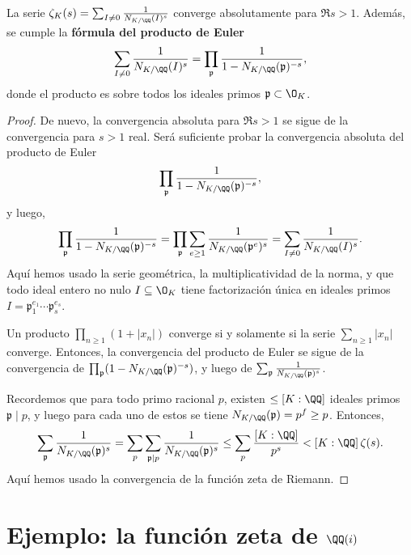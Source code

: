 \begin{proposicion}
  La serie $\zeta_K (s) = \sum_{I \ne 0} \frac{1}{N_{K/\QQ} (I)^s}$ converge
  absolutamente para $\Re s > 1$. Además, se cumple la
  \textbf{fórmula del producto de Euler}
  \[ \sum_{I \ne 0} \frac{1}{N_{K/\QQ} (I)^s} =
     \prod_{\mathfrak{p}} \frac{1}{1 - N_{K/\QQ} (\mathfrak{p})^{-s}}, \]
  donde el producto es sobre todos los ideales primos
  $\mathfrak{p} \subset \O_K$.

  \begin{proof}
    De nuevo, la convergencia absoluta para $\Re s > 1$ se sigue de la
    convergencia para $s > 1$ real. Será suficiente probar la convergencia
    absoluta del producto de Euler
    $$\prod_{\mathfrak{p}} \frac{1}{1 - N_{K/\QQ} (\mathfrak{p})^{-s}},$$
    y luego,
    \[ \prod_{\mathfrak{p}} \frac{1}{1 - N_{K/\QQ} (\mathfrak{p})^{-s}} =
       \prod_{\mathfrak{p}} \sum_{e \ge 1} \frac{1}{N_{K/\QQ} (\mathfrak{p}^e)^s} =
       \sum_{I\ne 0} \frac{1}{N_{K/\QQ} (I)^s}. \]
    Aquí hemos usado la serie geométrica, la multiplicatividad de la norma, y
    que todo ideal entero no nulo $I \subseteq \O_K$ tiene factorización única
    en ideales primos $I = \mathfrak{p}_1^{e_1}\cdots \mathfrak{p}_s^{e_s}$.

    Un producto $\prod_{n\ge 1} (1 + |x_n|)$ converge si y solamente si la serie
    $\sum_{n\ge 1} |x_n|$ converge. Entonces, la convergencia del producto de
    Euler se sigue de la convergencia de
    $\prod_{\mathfrak{p}} (1 - N_{K/\QQ} (\mathfrak{p})^{-s})$, y luego de
    $\sum_{\mathfrak{p}} \frac{1}{N_{K/\QQ} (\mathfrak{p})^s}$.

    Recordemos que para todo primo racional $p$, existen $\le [K:\QQ]$ ideales
    primos $\mathfrak{p} \mid p$, y luego para cada uno de estos se tiene
    $N_{K/\QQ} (\mathfrak{p}) = p^f \ge p$. Entonces,
    \[ \sum_{\mathfrak{p}} \frac{1}{N_{K/\QQ} (\mathfrak{p})^s} =
       \sum_p \sum_{\mathfrak{p} \mid p} \frac{1}{N_{K/\QQ} (\mathfrak{p})^s} \le
       \sum_p \frac{[K:\QQ]}{p^s} < [K : \QQ]\,\zeta (s). \]
    Aquí hemos usado la convergencia de la función zeta de Riemann.
  \end{proof}
\end{proposicion}


\section{Ejemplo: la función zeta de \texorpdfstring{$\QQ (i)$}{ℚ(i)}}
\label{sec:funcion-zeta-de-Q(i)}

